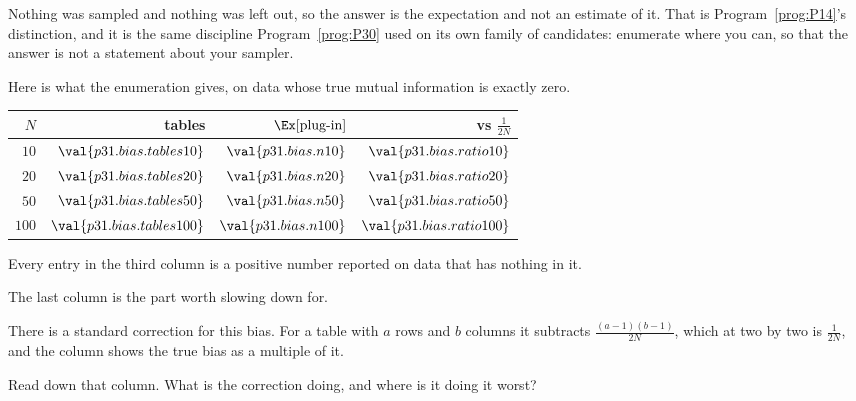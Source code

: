 \begin{fr}

Nothing was sampled and nothing was left out, so the answer is the
expectation and not an estimate of it. That is
Program~\ref{prog:P14}'s distinction, and it is the same discipline
Program~\ref{prog:P30} used on its own family of candidates: enumerate where
you can, so that the answer is not a statement about your sampler.

Here is what the enumeration gives, on data whose true mutual information is
exactly zero.

\begin{center}
\begin{tabular}{rrrr}
\toprule
$N$ & tables & $\Ex[\text{plug-in}]$ & vs $\frac{1}{2N}$ \\
\midrule
$10$ & $\val{p31.bias.tables10}$ & $\val{p31.bias.n10}$ & $\val{p31.bias.ratio10}$ \\
$20$ & $\val{p31.bias.tables20}$ & $\val{p31.bias.n20}$ & $\val{p31.bias.ratio20}$ \\
$50$ & $\val{p31.bias.tables50}$ & $\val{p31.bias.n50}$ & $\val{p31.bias.ratio50}$ \\
$100$ & $\val{p31.bias.tables100}$ & $\val{p31.bias.n100}$ & $\val{p31.bias.ratio100}$ \\
\bottomrule
\end{tabular}
\end{center}

Every entry in the third column is a positive number reported on data that
has nothing in it.
\end{fr}

\begin{fr}
The last column is the part worth slowing down for.

There is a standard correction for this bias. For a table with $a$ rows and
$b$ columns it subtracts $\frac{(a-1)(b-1)}{2N}$, which at two by two is
$\frac{1}{2N}$, and the column shows the true bias as a multiple of it.

Read down that column. What is the correction doing, and where is it doing
it worst?
\dotline
\nextframe
\end{fr}

